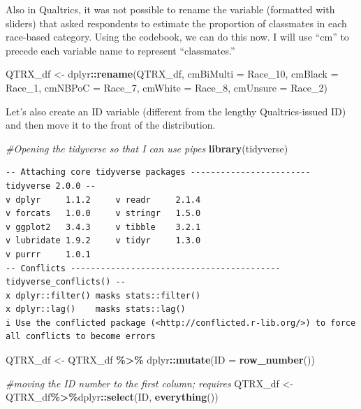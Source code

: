 \documentclass[
  11pt,
]{book}
\newenvironment{Shaded}{\begin{snugshade}}{\end{snugshade}}
\newcommand{\AttributeTok}[1]{\textcolor[rgb]{0.27,0.27,0.27}{#1}}
\newcommand{\CommentTok}[1]{\textcolor[rgb]{0.37,0.37,0.37}{\textit{#1}}}
\newcommand{\FunctionTok}[1]{\textcolor[rgb]{0.27,0.27,0.27}{\textbf{#1}}}
\newcommand{\NormalTok}[1]{#1}
\newcommand{\OtherTok}[1]{\textcolor[rgb]{0.37,0.37,0.37}{#1}}
\newcommand{\SpecialCharTok}[1]{\textcolor[rgb]{0.43,0.43,0.43}{\textbf{#1}}}
\begin{document}
Also in Qualtrics, it was not possible to rename the variable (formatted with sliders) that asked respondents to estimate the proportion of classmates in each race-based category. Using the codebook, we can do this now. I will use ``cm'' to precede each variable name to represent ``classmates.''

\begin{Shaded}
\begin{Highlighting}[]
\NormalTok{QTRX\_df }\OtherTok{\textless{}{-}}\NormalTok{ dplyr}\SpecialCharTok{::}\FunctionTok{rename}\NormalTok{(QTRX\_df, }\AttributeTok{cmBiMulti =}\NormalTok{ Race\_10, }\AttributeTok{cmBlack =}\NormalTok{ Race\_1, }\AttributeTok{cmNBPoC =}\NormalTok{ Race\_7, }\AttributeTok{cmWhite =}\NormalTok{ Race\_8, }\AttributeTok{cmUnsure =}\NormalTok{ Race\_2)}
\end{Highlighting}
\end{Shaded}

Let's also create an ID variable (different from the lengthy Qualtrics-issued ID) and then move it to the front of the distribution.

\begin{Shaded}
\begin{Highlighting}[]
\CommentTok{\#Opening the tidyverse so that I can use pipes}
\FunctionTok{library}\NormalTok{(tidyverse)}
\end{Highlighting}
\end{Shaded}

\begin{verbatim}
-- Attaching core tidyverse packages ------------------------ tidyverse 2.0.0 --
v dplyr     1.1.2     v readr     2.1.4
v forcats   1.0.0     v stringr   1.5.0
v ggplot2   3.4.3     v tibble    3.2.1
v lubridate 1.9.2     v tidyr     1.3.0
v purrr     1.0.1     
-- Conflicts ------------------------------------------ tidyverse_conflicts() --
x dplyr::filter() masks stats::filter()
x dplyr::lag()    masks stats::lag()
i Use the conflicted package (<http://conflicted.r-lib.org/>) to force all conflicts to become errors
\end{verbatim}

\begin{Shaded}
\begin{Highlighting}[]
\NormalTok{QTRX\_df }\OtherTok{\textless{}{-}}\NormalTok{ QTRX\_df }\SpecialCharTok{\%\textgreater{}\%}\NormalTok{ dplyr}\SpecialCharTok{::}\FunctionTok{mutate}\NormalTok{(}\AttributeTok{ID =} \FunctionTok{row\_number}\NormalTok{())}

\CommentTok{\#moving the ID number to the first column; requires }
\NormalTok{QTRX\_df }\OtherTok{\textless{}{-}}\NormalTok{ QTRX\_df}\SpecialCharTok{\%\textgreater{}\%}\NormalTok{dplyr}\SpecialCharTok{::}\FunctionTok{select}\NormalTok{(ID, }\FunctionTok{everything}\NormalTok{())}
\end{Highlighting}
\end{Shaded}
\end{document}
